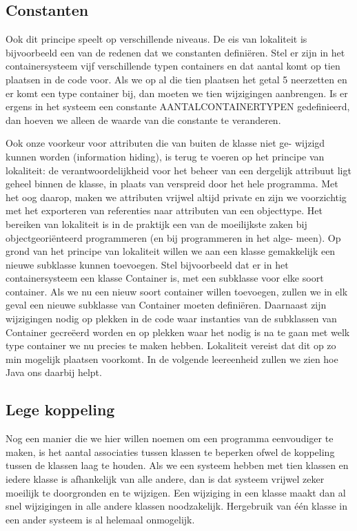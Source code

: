 \documentclass{article}
\begin{document}
	\subsection{Constanten}
	
	Ook dit principe speelt op verschillende niveaus. De eis van lokaliteit
	is bijvoorbeeld een van de redenen dat we constanten definiëren. Stel er
	zijn in het containersysteem vijf verschillende typen containers en dat
	aantal komt op tien plaatsen in de code voor. Als we op al die tien
	plaatsen het getal 5 neerzetten en er komt een type container bij, dan
	moeten we tien wijzigingen aanbrengen. Is er ergens in het systeem een
	constante AANTALCONTAINERTYPEN gedefinieerd, dan hoeven we alleen
	de waarde van die constante te veranderen.
	
	Ook onze voorkeur voor attributen die van buiten de klasse niet ge-
	wijzigd kunnen worden (information hiding), is terug te voeren op het
	principe van lokaliteit: de verantwoordelijkheid voor het beheer van een
	dergelijk attribuut ligt geheel binnen de klasse, in plaats van verspreid
	door het hele programma. Met het oog daarop, maken we attributen
	vrijwel altijd private en zijn we voorzichtig met het exporteren van
	referenties naar attributen van een objecttype.
	Het bereiken van lokaliteit is in de praktijk een van de moeilijkste zaken
	bij objectgeoriënteerd programmeren (en bij programmeren in het alge-
	meen).
	Op grond van het principe van lokaliteit willen we aan een klasse
	gemakkelijk een nieuwe subklasse kunnen toevoegen. Stel bijvoorbeeld
	dat er in het containersysteem een klasse Container is, met een subklasse
	voor elke soort container. Als we nu een nieuw soort container willen
	toevoegen, zullen we in elk geval een nieuwe subklasse van Container
	moeten definiëren. Daarnaast zijn wijzigingen nodig op plekken in de
	code waar instanties van de subklassen van Container gecreëerd worden
	en op plekken waar het nodig is na te gaan met welk type container we
	nu precies te maken hebben. Lokaliteit vereist dat dit op zo min mogelijk
	plaatsen voorkomt. In de volgende leereenheid zullen we zien hoe Java
	ons daarbij helpt.
	
	\subsection{Lege koppeling}
		
	Nog een manier die we hier willen noemen om een programma
	eenvoudiger te maken, is het aantal associaties tussen klassen te
	beperken ofwel de koppeling tussen de klassen laag te houden. Als we een
	systeem hebben met tien klassen en iedere klasse is afhankelijk van alle
	andere, dan is dat systeem vrijwel zeker moeilijk te doorgronden en te
	wijzigen. Een wijziging in een klasse maakt dan al snel wijzigingen in
	alle andere klassen noodzakelijk. Hergebruik van één klasse in een ander
	systeem is al helemaal onmogelijk.
	
\end{document}
